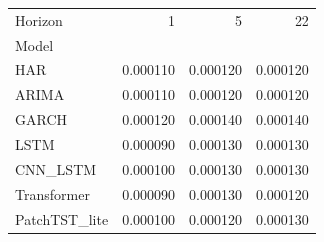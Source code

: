 \begin{tabular}{lrrr}
\toprule
Horizon & 1 & 5 & 22 \\
Model &  &  &  \\
\midrule
HAR & 0.000110 & 0.000120 & 0.000120 \\
ARIMA & 0.000110 & 0.000120 & 0.000120 \\
GARCH & 0.000120 & 0.000140 & 0.000140 \\
LSTM & 0.000090 & 0.000130 & 0.000130 \\
CNN_LSTM & 0.000100 & 0.000130 & 0.000130 \\
Transformer & 0.000090 & 0.000130 & 0.000120 \\
PatchTST_lite & 0.000100 & 0.000120 & 0.000130 \\
\bottomrule
\end{tabular}
